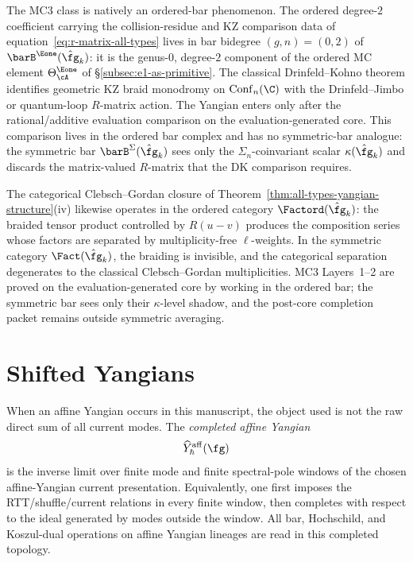 \begin{remark}
\label{rem:mc3-ordered-bar-bridge}
The MC3 class is natively an ordered-bar phenomenon. The
ordered degree-$2$ coefficient carrying the collision-residue and KZ
comparison data of equation~\eqref{eq:r-matrix-all-types} lives in bar bidegree
$(g,n) = (0,2)$ of $\barB^{\Eone}(\hat{\fg}_k)$: it is the
genus-$0$, degree-$2$ component of the ordered MC element
$\Theta_\cA^{\Eone}$ of
\S\textup{\ref{subsec:e1-as-primitive}}. The classical
Drinfeld--Kohno theorem identifies geometric KZ braid monodromy on
$\operatorname{Conf}_n(\C)$ with the Drinfeld--Jimbo or
quantum-loop $R$-matrix action.  The Yangian enters only after the
rational/additive evaluation comparison on the evaluation-generated
core.  This comparison lives in the ordered bar complex and has no
symmetric-bar analogue: the symmetric bar
$\barB^{\Sigma}(\hat{\fg}_k)$ sees only the
$\Sigma_n$-coinvariant scalar $\kappa(\hat{\fg}_k)$ and discards
the matrix-valued $R$-matrix that the DK comparison requires.

The categorical Clebsch--Gordan closure of
Theorem~\textup{\ref{thm:all-types-yangian-structure}(iv)} likewise operates
in the ordered category $\Factord(\hat{\fg}_k)$: the braided
tensor product controlled by $R(u{-}v)$ produces the
composition series whose factors are separated by
multiplicity-free $\ell$-weights. In the symmetric category
$\Fact(\hat{\fg}_k)$, the braiding is invisible, and the
categorical separation degenerates to the classical
Clebsch--Gordan multiplicities. MC3 Layers~1--2 are proved on the
evaluation-generated core by working in the ordered bar; the symmetric
bar sees only their $\kappa$-level shadow, and the post-core
completion packet remains outside symmetric averaging.
\end{remark}

\section{Shifted Yangians}
\label{sec:shifted-yangians}

\begin{definition}
\label{def:affine-yangian-completion}
When an affine Yangian occurs in this manuscript, the object used is
not the raw direct sum of all current modes.  The
\emph{completed affine Yangian}
\[
\widehat Y^{\mathrm{aff}}_\hbar(\fg)
\]
is the inverse limit over finite mode and finite spectral-pole
windows of the chosen affine-Yangian current presentation.  Equivalently,
one first imposes the RTT/shuffle/current relations in every finite
window, then completes with respect to the ideal generated by modes
outside the window.  All bar, Hochschild, and Koszul-dual operations
on affine Yangian lineages are read in this completed topology.
\end{definition}

